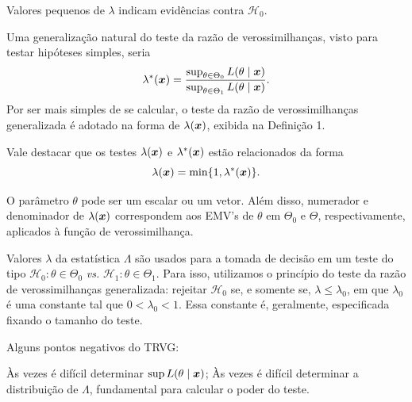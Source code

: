 Valores pequenos de $\lambda$ indicam evidências contra $\mathcal{H}_0$.

Uma generalização natural do teste da razão de verossimilhanças, visto para testar hipóteses simples, seria
\begin{equation}
\lambda^*(\bm{x})=\frac{\sup_{\theta\in\Theta_0}L(\theta\mid\bm{x})}{\sup_{\theta\in\Theta_1}L(\theta\mid\bm{x})}.
\end{equation}
Por ser mais simples de se calcular, o teste da razão de verossimilhanças generalizada é adotado na forma de $\lambda(\bm{x})$, exibida na Definição 1.

Vale destacar que os testes $\lambda(\bm{x})$ e $\lambda^*(\bm{x})$ estão relacionados da forma
\begin{equation}
\lambda(\bm{x})=\min\{1,\lambda^*(\bm{x})\}.
\end{equation}

\begin{note}
	\leavevmode
	\begin{outline}[enumerate]
		\1 O parâmetro $\theta$ pode ser um escalar ou um vetor. Além disso, numerador e denominador de $\lambda(\bm{x})$ correspondem aos EMV's de $\theta$ em $\Theta_0$ e $\Theta$, respectivamente, aplicados à função de verossimilhança.
	\end{outline}
\end{note}

Valores $\lambda$ da estatística $\Lambda$ são usados para a tomada de decisão em um teste do tipo $\mathcal{H}_0:\theta\in\Theta_0$ \emph{vs.} $\mathcal{H}_1:\theta\in\Theta_1$. Para isso, utilizamos o princípio do teste da razão de verossimilhanças generalizada: rejeitar $\mathcal{H}_0$ se, e somente se, $\lambda\leq\lambda_0$, em que $\lambda_0$ é uma constante tal que $0<\lambda_0<1$. Essa constante é, geralmente, especificada fixando o tamanho do teste.

Alguns pontos negativos do TRVG:
\begin{outline}
\1 Às vezes é difícil determinar $\sup L(\theta\mid\bm{x})$;
\1 Às vezes é difícil determinar a distribuição de $\Lambda$, fundamental para calcular o poder do teste.
\end{outline}

